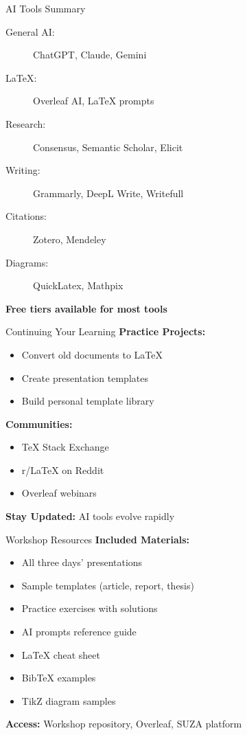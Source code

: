 \documentclass[aspectratio=169]{beamer}
\begin{document}
	\begin{frame}{AI Tools Summary}
		\begin{description}
			\item[General AI:] ChatGPT, Claude, Gemini
			\item[LaTeX:] Overleaf AI, LaTeX prompts
			\item[Research:] Consensus, Semantic Scholar, Elicit
			\item[Writing:] Grammarly, DeepL Write, Writefull
			\item[Citations:] Zotero, Mendeley
			\item[Diagrams:] QuickLatex, Mathpix
		\end{description}
		
		\vspace{0.5em}
		
		\textbf{Free tiers available for most tools}
	\end{frame}
	
	\begin{frame}{Continuing Your Learning}
		\textbf{Practice Projects:}
		\begin{itemize}
			\item Convert old documents to LaTeX
			\item Create presentation templates
			\item Build personal template library
		\end{itemize}
		
		\vspace{0.5em}
		
		\textbf{Communities:}
		\begin{itemize}
			\item TeX Stack Exchange
			\item r/LaTeX on Reddit
			\item Overleaf webinars
		\end{itemize}
		
		\vspace{0.5em}
		
		\textbf{Stay Updated:} AI tools evolve rapidly
	\end{frame}
	
	\begin{frame}{Workshop Resources}
		\textbf{Included Materials:}
		
		\begin{itemize}
			\item All three days' presentations
			\item Sample templates (article, report, thesis)
			\item Practice exercises with solutions
			\item AI prompts reference guide
			\item LaTeX cheat sheet
			\item BibTeX examples
			\item TikZ diagram samples
		\end{itemize}
		
		\vspace{0.5em}
		
		\textbf{Access:} Workshop repository, Overleaf, SUZA platform
	\end{frame}
	
\end{document}
